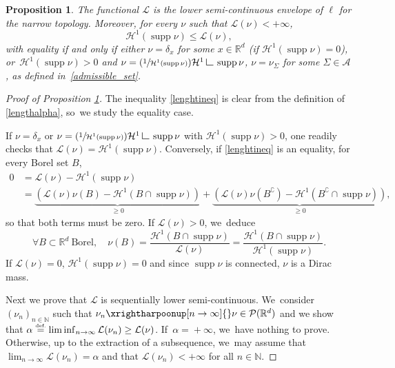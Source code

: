 \documentclass[JEP,XML,SOM,Unicode,NoFloatCountersInSection,published]{cedram}
\newcommand{\Psfrac}[2]{(\sfrac{#1}{#2})}
\newtheorem{proposition}[theorem]{Proposition}
\theoremstyle{definition}
\newcommand{\eqdef}{\ensuremath{\stackrel{\mbox{\upshape\tiny def.}}{=}}}
\newcommand\LM[1]{\hbox{\vrule width.5pt \vbox to#1pt{\vfill \hrule width#1pt height.5pt}}}
\newcommand\LL{{\mathchoice {\>\LM7\>}{\>\LM7\>}{\,\LM5\,}{\,\LM{3.35}\,}}}
\newcommand{\mres}{\LL}
\newcommand\cH{\mathcal{H}}
\newcommand{\RR}{\mathbb{R}}
\DeclareMathOperator{\supp}{supp}
\begin{document}
\begin{proposition}
\label{proposition.length_functional_is_lsc}
The functional $\mathcal{L}$ is the lower semi-continuous envelope of $\ell$ for the narrow topology. Moreover, for every $\nu$ such that $\mathcal{L}(\nu)<+\infty$,
\begin{equation}\label{lenghtineq}
\cH^1(\supp \nu)\leq \mathcal{L}(\nu),
\end{equation}
with equality if and only if either $\nu=\delta_x$ for some $x \in \RR^d$ (if $\cH^1(\supp\nu)=0$), or~$\cH^1(\supp\nu)>0$ and $ \nu=\Psfrac{1}{\cH^1(\supp \nu)}\cH^1\mres \supp \nu$, \ie $\nu = \nu_\Sigma$ for some $\Sigma \in \mathcal{A}$, as defined in~\eqref{admissible_set}.
\end{proposition}

\begin{proof}[Proof of Proposition \ref{proposition.length_functional_is_lsc}]
The inequality \eqref{lenghtineq} is clear from the definition of \eqref{lengthalpha}, so~we study the equality case.

If $\nu=\delta_x$ or $\nu=\Psfrac{1}{\cH^1(\supp \nu)}\cH^1\mres \supp \nu$ with $\cH^1(\supp\nu)>0$, one readily checks that $\mathcal{L}(\nu)=\cH^1(\supp \nu)$.
Conversely, if \eqref{lenghtineq} is an equality, for every Borel set $B$,
\begin{align*}
0 &= \mathcal{L}(\nu)-\cH^1(\supp\nu) \\
&= \underbrace{\left(\mathcal{L}(\nu)\nu(B)-\cH^1(B\cap \supp\nu)\right)}_{\geq 0}+ \underbrace{\left(\mathcal{L}(\nu)\nu(B^\complement)-\cH^1(B^\complement\cap \supp\nu)\right)}_{\geq 0},
\end{align*}
so that both terms must be zero. If $\mathcal{L}(\nu)>0$, we~deduce
\begin{equation*}
\forall B\subset \RR^d\ \mbox{Borel},\quad \nu(B) = \frac{\cH^1(B\cap \supp\nu)}{\mathcal{L}(\nu)}= \frac{\cH^1(B\cap \supp\nu)}{\cH^1(\supp \nu)}.
\end{equation*}
If $\mathcal{L}(\nu)=0$, $\cH^1(\supp\nu)=0$ and since $\supp \nu$ is connected, $\nu$ is a Dirac mass.

Next we prove that $\mathcal{L}$ is sequentially lower semi-continuous. We~consider $(\nu_{n})_{n\in \mathbb{N}}$ such that $\nu_n \xrightharpoonup[n \to \infty]{} \nu \in \mathcal{P}(\RR^d)$ and we show that $\alpha \eqdef \liminf_{n \to \infty} \mathcal{L}(\nu_n) \geq \mathcal{L}(\nu)$. If~$\alpha\!=\!+\infty$, we~have nothing to prove. Otherwise, up to the extraction of a subsequence, we~may assume that $\lim_{n \to \infty} \mathcal{L}(\nu_n)=\alpha$ and that $\mathcal{L}(\nu_n)<+\infty$ for all $n \in \mathbb{N}$.


\end{proof}
\end{document}
